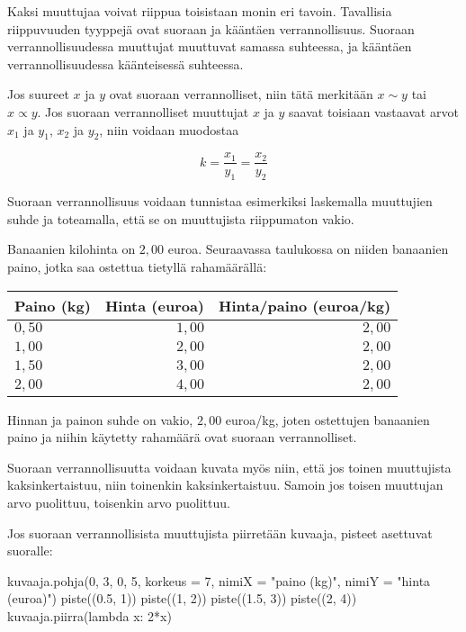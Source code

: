 Kaksi muuttujaa voivat riippua toisistaan monin eri tavoin.
Tavallisia riippuvuuden tyyppejä ovat suoraan ja kääntäen verrannollisuus.
Suoraan verrannollisuudessa muuttujat muuttuvat samassa suhteessa, ja kääntäen verrannollisuudessa käänteisessä suhteessa.


Jos suureet $x$ ja $y$ ovat suoraan verrannolliset, niin tätä merkitään $x\sim y$ tai $x\propto y$. Jos suoraan verrannolliset muuttujat $x$ ja $y$ saavat toisiaan vastaavat arvot $x_1$ ja $y_1$, $x_2$ ja $y_2$, niin voidaan muodostaa 

$$ k = \frac{x_1}{y_1} = \frac{x_2}{y_2}$$

Suoraan verrannollisuus voidaan tunnistaa esimerkiksi laskemalla muuttujien
suhde ja toteamalla, että se on muuttujista riippumaton vakio.

\begin{esimerkki}
Banaanien kilohinta on $2,00$ euroa. Seuraavassa taulukossa on niiden
banaanien paino, jotka saa ostettua tietyllä rahamäärällä:
\begin{center} 
\begin{tabular}{|l|r|r|}
\hline
Paino (kg) & Hinta (euroa) & Hinta/paino (euroa/kg) \\
\hline
$0,50$ & $1,00$ & $2,00$ \\
$1,00$ & $2,00$ & $2,00$ \\
$1,50$ & $3,00$ & $2,00$ \\
$2,00$ & $4,00$ & $2,00$ \\
\hline
\end{tabular}
\end{center}
Hinnan ja painon suhde on vakio, $2,00$ euroa/kg, joten ostettujen
banaanien paino ja niihin käytetty rahamäärä ovat suoraan verrannolliset.
\end{esimerkki}

Suoraan verrannollisuutta voidaan kuvata myös niin, että jos
toinen muuttujista kaksinkertaistuu, niin toinenkin kaksinkertaistuu.
Samoin jos toisen muuttujan arvo puolittuu, toisenkin arvo puolittuu.

Jos suoraan verrannollisista muuttujista piirretään kuvaaja, pisteet
asettuvat suoralle:

\begin{center}
\begin{kuva}
    kuvaaja.pohja(0, 3, 0, 5, korkeus = 7, nimiX = "paino (kg)", nimiY = "hinta (euroa)")
    piste((0.5, 1))
    piste((1, 2))
    piste((1.5, 3))
    piste((2, 4))
    kuvaaja.piirra(lambda x: 2*x)
\end{kuva}
\end{center}

